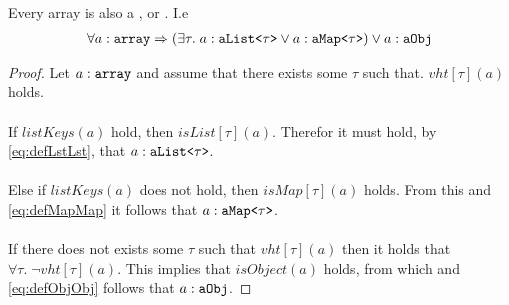 \begin{lemma} Every array is also a \pamap, \palst{} or \paobj. I.e
\begin{align*}
\forall a : \texttt{array} \Rightarrow (\exists \tau.\; a : \texttt{aList<$\tau$>} \vee a : \texttt{aMap<$\tau$>}) \vee a : \texttt{aObj}
\end{align*}
\end{lemma}
\begin{proof}
Let $a : \texttt{array}$ and assume that there exists some $\tau$ such that. $vht[\tau](a)$ holds. \\\\
If $listKeys(a)$ hold, then $isList[\tau](a)$. Therefor it must hold, by \ref{eq:defLstLst}, that $a : \texttt{aList<$\tau$>}$. \\\\
Else if $listKeys(a)$ does not hold, then $isMap[\tau](a)$ holds. From this and \ref{eq:defMapMap} it follows that $a : \texttt{aMap<$\tau$>}$.\\\\
If there does not exists some $\tau$ such that $vht[\tau](a)$ then it holds that $\forall \tau.\; \neg vht[\tau](a)$. This implies that $isObject(a)$ holds, from which and \ref{eq:defObjObj} follows that $a : \texttt{aObj}$.

\end{proof}


